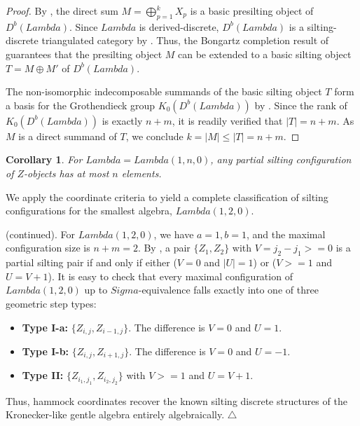 \documentclass[11pt, a4paper]{article}
\newtheorem{corollary}[theorem]{Corollary}
\theoremstyle{definition}
\def\Lambda{Lambda}%
\def\Sigma{Sigma}%
\def\ge{>=}%
\def\mathcal#1{#1}%
\def\Db{D^b}%
\newcommand{\Db}{\mathcal{D}^b}
\begin{document}
\begin{proof}
By , the direct sum $M=\bigoplus_{p=1}^{k} X_p$ is a basic presilting object of $\Db(\Lambda)$. Since $\Lambda$ is derived-discrete, $\Db(\Lambda)$ is a silting-discrete triangulated category by . Thus, the Bongartz completion result of  guarantees that the presilting object $M$ can be extended to a basic silting object $T = M\oplus M'$ of $\Db(\Lambda)$.

The non-isomorphic indecomposable summands of the basic silting object $T$ form a basis for the Grothendieck group $K_0(\Db(\Lambda))$ by . Since the rank of $K_0(\Db(\Lambda))$ is exactly $n+m$, it is readily verified that $|T| = n+m$. As $M$ is a direct summand of $T$, we conclude $k = |M| \le |T| = n+m$.
\end{proof}

\begin{corollary}\label{cor:bound-1n0}
For $\Lambda = \Lambda(1,n,0)$, any partial silting configuration of $\mathcal Z$-objects has at most $n$ elements.
\end{corollary}

We apply the coordinate criteria to yield a complete classification of silting configurations for the smallest algebra, $\Lambda(1,2,0)$.

 (continued). For $\Lambda(1,2,0)$, we have $a=1, b=1$, and the maximal configuration size is $n+m = 2$. By , a pair $\{Z_1, Z_2\}$ with $V = j_2 - j_1 \ge 0$ is a partial silting pair if and only if either ($V=0$ and $|U|=1$) or ($V \ge 1$ and $U = V+1$). It is easy to check that every maximal configuration of $\Lambda(1,2,0)$ up to $\Sigma$-equivalence falls exactly into one of three geometric step types:
\begin{itemize}
    \item \textbf{Type I-a:} $\{Z_{i,j}, Z_{i-1,j}\}$. The difference is $V=0$ and $U=1$.
    \item \textbf{Type I-b:} $\{Z_{i,j}, Z_{i+1,j}\}$. The difference is $V=0$ and $U=-1$.
    \item \textbf{Type II:} $\{Z_{i_1,j_1}, Z_{i_2,j_2}\}$ with $V \ge 1$ and $U = V+1$.
\end{itemize}
Thus, hammock coordinates recover the known silting discrete structures of the Kronecker-like gentle algebra entirely algebraically. \hfill $\triangle$


\end{document}
